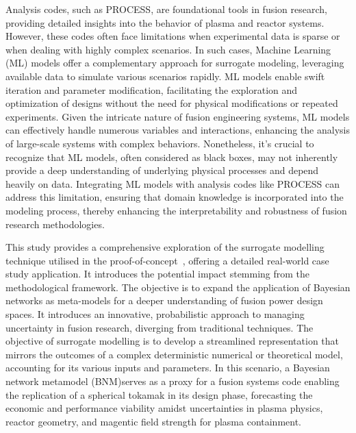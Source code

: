 \documentclass[journal]{IEEEtran}
\begin{document}
Analysis codes, such as PROCESS, are foundational tools in fusion research, providing detailed insights into the behavior of plasma and reactor systems. However, these codes often face limitations when experimental data is sparse or when dealing with highly complex scenarios. In such cases, Machine Learning (ML) models offer a complementary approach for surrogate modeling, leveraging available data to simulate various scenarios rapidly. ML models enable swift iteration and parameter modification, facilitating the exploration and optimization of designs without the need for physical modifications or repeated experiments. Given the intricate nature of fusion engineering systems, ML models can effectively handle numerous variables and interactions, enhancing the analysis of large-scale systems with complex behaviors. Nonetheless, it's crucial to recognize that ML models, often considered as black boxes, may not inherently provide a deep understanding of underlying physical processes and depend heavily on data. Integrating ML models with analysis codes like PROCESS can address this limitation, ensuring that domain knowledge is incorporated into the modeling process, thereby enhancing the interpretability and robustness of fusion research methodologies.

This study provides a comprehensive exploration of the surrogate modelling technique utilised in the proof-of-concept~\cite{Griffiths2024}, offering a detailed real-world case study application. It introduces the potential impact stemming from the methodological framework. The objective is to expand the application of Bayesian networks as meta-models for a deeper understanding of fusion power design spaces. It introduces an innovative, probabilistic approach to managing uncertainty in fusion research, diverging from traditional techniques. The objective of surrogate modelling is to develop a streamlined representation that mirrors the outcomes of a complex deterministic numerical or theoretical model, accounting for its various inputs and parameters. In this scenario, a Bayesian network metamodel (BNM)serves as a proxy for a fusion systems code enabling the replication of a spherical tokamak in its design phase, forecasting the economic and performance viability amidst uncertainties in plasma physics, reactor geometry, and magentic field strength for plasma containment.
\end{document}
